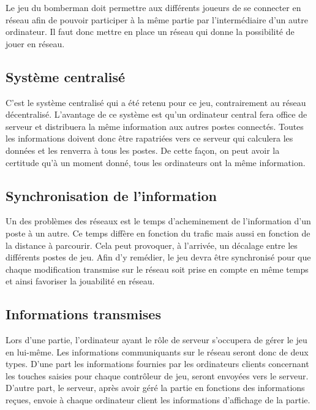 Le jeu du bomberman doit permettre aux différents joueurs de se connecter en réseau afin de pouvoir participer à la même partie par l'intermédiaire d'un autre ordinateur. Il faut donc mettre en place un réseau qui donne la possibilité de jouer en réseau. 

\subsection{Système centralisé}
C'est le système centralisé qui a été retenu pour ce jeu, contrairement au réseau décentralisé. L'avantage de ce système est qu'un ordinateur central fera office de serveur et distribuera la même information aux autres postes connectés. Toutes les informations doivent donc être rapatriées vers ce serveur qui calculera les données et les renverra à tous les postes. De cette façon, on peut avoir la certitude qu'à un moment donné, tous les ordinateurs ont la même information.

\subsection{Synchronisation de l'information}
Un des problèmes des réseaux est le temps d'acheminement de l'information d'un poste à un autre. Ce temps diffère en fonction du trafic mais aussi en fonction de la distance à parcourir. Cela peut provoquer, à l'arrivée, un décalage entre les différents postes de jeu. Afin d'y remédier, le jeu devra être synchronisé pour que chaque modification transmise sur le réseau soit prise en compte en même temps et ainsi favoriser la jouabilité en réseau.

\subsection{Informations transmises}
Lors d'une partie, l'ordinateur ayant le rôle de serveur s'occupera de gérer le jeu en lui-même. Les informations communiquants sur le réseau seront donc de deux types. D'une part les informations fournies par les ordinateurs clients concernant les touches saisies pour chaque contrôleur de jeu, seront envoyées vers le serveur. D'autre part, le serveur, après avoir géré la partie en fonctions des informations reçues, envoie à chaque ordinateur client les informations d'affichage de la partie.
